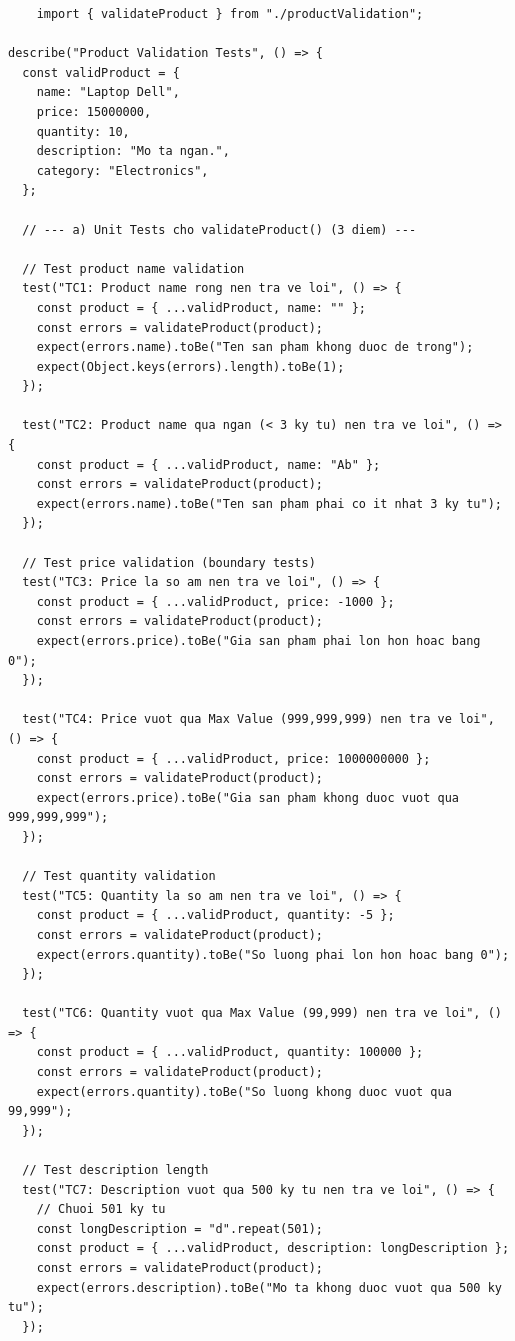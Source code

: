 \documentclass[a4paper,12pt]{article}
\begin{document}
\begin{tcolorbox}[breakable, colback=green!5,colframe=black!50,title=productValidation.test.js]
\begin{lstlisting}
    import { validateProduct } from "./productValidation";

describe("Product Validation Tests", () => {
  const validProduct = {
    name: "Laptop Dell",
    price: 15000000,
    quantity: 10,
    description: "Mo ta ngan.",
    category: "Electronics",
  };

  // --- a) Unit Tests cho validateProduct() (3 diem) ---

  // Test product name validation
  test("TC1: Product name rong nen tra ve loi", () => {
    const product = { ...validProduct, name: "" };
    const errors = validateProduct(product);
    expect(errors.name).toBe("Ten san pham khong duoc de trong");
    expect(Object.keys(errors).length).toBe(1);
  });

  test("TC2: Product name qua ngan (< 3 ky tu) nen tra ve loi", () => {
    const product = { ...validProduct, name: "Ab" };
    const errors = validateProduct(product);
    expect(errors.name).toBe("Ten san pham phai co it nhat 3 ky tu");
  });

  // Test price validation (boundary tests)
  test("TC3: Price la so am nen tra ve loi", () => {
    const product = { ...validProduct, price: -1000 };
    const errors = validateProduct(product);
    expect(errors.price).toBe("Gia san pham phai lon hon hoac bang 0");
  });

  test("TC4: Price vuot qua Max Value (999,999,999) nen tra ve loi", () => {
    const product = { ...validProduct, price: 1000000000 };
    const errors = validateProduct(product);
    expect(errors.price).toBe("Gia san pham khong duoc vuot qua 999,999,999");
  });

  // Test quantity validation
  test("TC5: Quantity la so am nen tra ve loi", () => {
    const product = { ...validProduct, quantity: -5 };
    const errors = validateProduct(product);
    expect(errors.quantity).toBe("So luong phai lon hon hoac bang 0");
  });

  test("TC6: Quantity vuot qua Max Value (99,999) nen tra ve loi", () => {
    const product = { ...validProduct, quantity: 100000 };
    const errors = validateProduct(product);
    expect(errors.quantity).toBe("So luong khong duoc vuot qua 99,999");
  });

  // Test description length
  test("TC7: Description vuot qua 500 ky tu nen tra ve loi", () => {
    // Chuoi 501 ky tu
    const longDescription = "d".repeat(501);
    const product = { ...validProduct, description: longDescription };
    const errors = validateProduct(product);
    expect(errors.description).toBe("Mo ta khong duoc vuot qua 500 ky tu");
  });


\end{lstlisting}
\end{tcolorbox}
\end{document}
